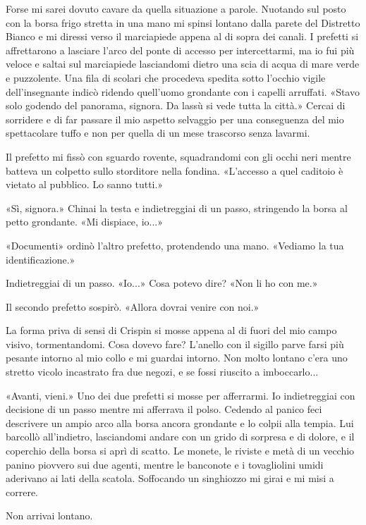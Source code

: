Forse mi sarei dovuto cavare da quella situazione a parole. Nuotando sul
posto con la borsa frigo stretta in una mano mi spinsi lontano dalla
parete del Distretto Bianco e mi diressi verso il marciapiede appena al
di sopra dei canali. I prefetti si affrettarono a lasciare l'arco del
ponte di accesso per intercettarmi, ma io fui più veloce e saltai sul
marciapiede lasciandomi dietro una scia di acqua di mare verde e
puzzolente. Una fila di scolari che procedeva spedita sotto l'occhio
vigile dell'insegnante indicò ridendo quell'uomo grondante con i capelli
arruffati. «Stavo solo godendo del panorama, signora. Da lassù si vede
tutta la città.» Cercai di sorridere e di far passare il mio aspetto
selvaggio per una conseguenza del mio spettacolare tuffo e non per
quella di un mese trascorso senza lavarmi.

Il prefetto mi fissò con sguardo rovente, squadrandomi con gli occhi
neri mentre batteva un colpetto sullo storditore nella fondina.
«L'accesso a quel caditoio è vietato al pubblico. Lo sanno tutti.»

«Sì, signora.» Chinai la testa e indietreggiai di un passo, stringendo
la borsa al petto grondante. «Mi dispiace, io...»

«Documenti» ordinò l'altro prefetto, protendendo una mano. «Vediamo la
tua identificazione.»

Indietreggiai di un passo. «Io...» Cosa potevo dire? «Non li ho con me.»

Il secondo prefetto sospirò. «Allora dovrai venire con noi.»

La forma priva di sensi di Crispin si mosse appena al di fuori del mio
campo visivo, tormentandomi. Cosa dovevo fare? L'anello con il sigillo
parve farsi più pesante intorno al mio collo e mi guardai intorno. Non
molto lontano c'era uno stretto vicolo incastrato fra due negozi, e se
fossi riuscito a imboccarlo...

«Avanti, vieni.» Uno dei due prefetti si mosse per afferrarmi. Io
indietreggiai con decisione di un passo mentre mi afferrava il polso.
Cedendo al panico feci descrivere un ampio arco alla borsa ancora
grondante e lo colpii alla tempia. Lui barcollò all'indietro,
lasciandomi andare con un grido di sorpresa e di dolore, e il coperchio
della borsa si aprì di scatto. Le monete, le riviste e metà di un
vecchio panino piovvero sui due agenti, mentre le banconote e i
tovagliolini umidi aderivano ai lati della scatola. Soffocando un
singhiozzo mi girai e mi misi a correre.

Non arrivai lontano.

